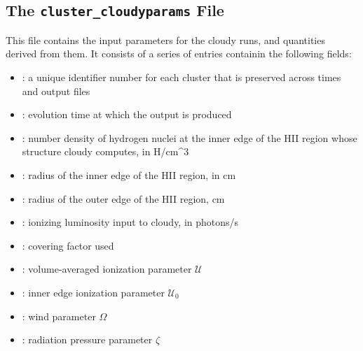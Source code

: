 \documentclass[letterpaper,10pt,english]{sphinxmanual}
\begin{document}
\subsection{The \texttt{cluster\_cloudyparams} File}
\label{cloudy:the-cluster-cloudyparams-file}
This file contains the input parameters for the cloudy runs, and
quantities derived from them. It consists of a series of entries
containin the following fields:
\begin{itemize}
\item {} 
: a unique identifier number for each cluster that is
preserved across times and output files

\item {} 
: evolution time at which the output is produced

\item {} 
: number density of hydrogen nuclei at the inner edge of the
HII region whose structure cloudy computes, in H/cm\textasciicircum{}3

\item {} 
: radius of the inner edge of the HII region, in cm

\item {} 
: radius of the outer edge of the HII region, cm

\item {} 
: ionizing luminosity input to cloudy, in photons/s

\item {} 
: covering factor used

\item {} 
: volume-averaged ionization parameter \(\mathcal{U}\)

\item {} 
: inner edge ionization parameter \(\mathcal{U}_0\)

\item {} 
: wind parameter \(\Omega\)

\item {} 
: radiation pressure parameter \(\zeta\)

\end{itemize}
\end{document}
